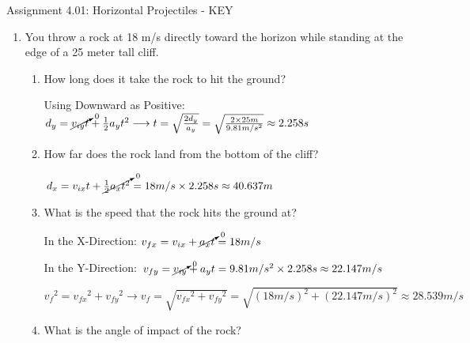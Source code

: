 \documentclass[letterpaper, 12pt]{article}
\begin{document}


\begin{center} Assignment 4.01: Horizontal Projectiles  - KEY
\end{center}





\begin{enumerate}

\item You throw a rock at 18 m/s directly toward the horizon while standing at the edge of a 25 meter tall cliff.  
\begin{enumerate}
	\item How long does it take the rock to hit the ground?
	
	\color{red} Using Downward as Positive: $d_y = \cancelto{0}{v_{iy}t} + \frac{1}{2}a_yt^2 \longrightarrow  t = \sqrt{\frac{2d_y}{a_y}}  = \sqrt{\frac{2 \times 25 m}{9.81 m/s^2}} \approx 2.258 s $ 
	
	\vspace{0.15in}
	\color{black}
	\item How far does the rock land from the bottom of the cliff?

	\color{red}
		$d_x = {v_{ix}t} + \cancelto{0}{\frac{1}{2}a_x t^2} = 18 m/s \times 2.258s \approx 40.637m $
	
	\vspace{0.15in}
	\color{black}
	
	\item What is the speed that the rock hits the ground at?	

	\color{red}
	In the X-Direction: $ v_{fx} = v_{ix} + \cancelto{0}{a_x t} = 18 m/s$
	
	In the Y-Direction: $ v_{fy} = \cancelto{0}{v_{iy}} + a_y t = 9.81 m/s^2 \times 2.258s \approx 22.147 m/s$
	
 $ {v_f}^2 = {v_{fx}}^2 + {v_{fy}}^2 \longrightarrow {v_f} = \sqrt{{v_{fx}}^2 + {v_{fy}}^2} = \sqrt{(18 m/s)^2 + (22.147 m/s)^2} \approx 28.539 m/s  $
	
	\color{black}
	\item What is the angle of impact of the rock?
		\vspace{.1in}
		

\end{enumerate}
\end{enumerate}
\end{document}
